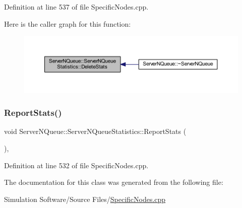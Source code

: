 Definition at line 537 of file Specific\+Nodes.\+cpp.

Here is the caller graph for this function\+:
\nopagebreak
\begin{figure}[H]
\begin{center}
\leavevmode
\includegraphics[width=350pt]{class_server_n_queue_1_1_server_n_queue_statistics_ade4ec4cac903d382590362780a94b14d_icgraph}
\end{center}
\end{figure}
\mbox{\label{class_server_n_queue_1_1_server_n_queue_statistics_a65e23fedacbcba37a1033a690d7b10fd}} 
\subsubsection{\texorpdfstring{Report\+Stats()}{ReportStats()}}
{\footnotesize\ttfamily void Server\+N\+Queue\+::\+Server\+N\+Queue\+Statistics\+::\+Report\+Stats (\begin{DoxyParamCaption}{ }\end{DoxyParamCaption})\hspace{0.3cm}{\ttfamily [inline]}, {\ttfamily [override]}}



Definition at line 532 of file Specific\+Nodes.\+cpp.



The documentation for this class was generated from the following file\+:\begin{DoxyCompactItemize}
\item 
Simulation Software/\+Source Files/\hyperlink{_specific_nodes_8cpp}{Specific\+Nodes.\+cpp}\end{DoxyCompactItemize}
